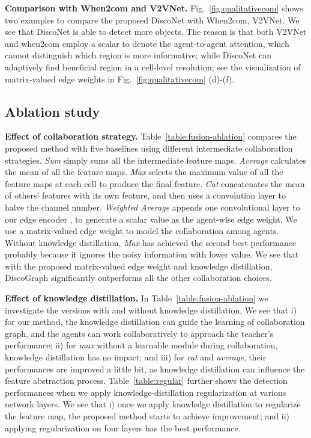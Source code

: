 \documentclass{article}
\begin{document}
\textbf{Comparison with When2com and V2VNet.} Fig.~\ref{fig:qualitativecom} shows two examples to compare the proposed DiscoNet with When2com, V2VNet. We see that DiscoNet is able to detect more objects. The reason is that both V2VNet and when2com  employ a scalar to denote the agent-to-agent attention, which cannot distinguish which region is more informative; while DiscoNet can adaptively find beneficial region in a cell-level resolution; see the visualization of matrix-valued edge weights in Fig.~\ref{fig:qualitativecom} (d)-(f). 




\vspace{-3mm}
\subsection{Ablation study}
\vspace{-2mm}

\textbf{Effect of collaboration strategy.} Table~\ref{table:fusion-ablation} compares the proposed method with five baselines using different intermediate collaboration strategies. \textit{Sum} simply sums all the intermediate feature maps. \textit{Average} calculates the mean of all the feature maps. \textit{Max} selects the maximum value of all the feature maps at each cell to produce the final feature. \textit{Cat} concatenates the mean of others' features with its own feature, and then uses a convolution layer to halve the channel number. \textit{Weighted Average} appends one convolutional layer to our edge encoder , to generate a scalar value as the agent-wise edge weight. We use a matrix-valued edge weight to model the collaboration among agents. Without knowledge distillation, \textit{Max} has achieved the second best performance probably because it ignores the noisy information with lower value. We see that with the proposed matrix-valued edge weight and knowledge distillation, DiscoGraph significantly outperforms all the other collaboration choices.


\textbf{Effect of knowledge distillation.} In Table~\ref{table:fusion-ablation} we investigate the versions with and without knowledge distillation,  We see that i) for our method, the knowledge distillation can guide the learning of collaboration graph, and the agents can work collaboratively to approach the teacher's performance; ii) for \textit{max} without a learnable module during collaboration, knowledge distillation has no impact; and iii) for \textit{cat} and \textit{average}, their performances are improved a little bit, as knowledge distillation can influence the feature abstraction process. Table~\ref{table:regular} further shows the detection performances when we apply knowledge-distillation regularization at various network layers. 
We see that i) once we apply knowledge distillation to regularize the feature map, the proposed method starts to achieve improvement; and ii) applying regularization on four layers has the best performance.
\end{document}
